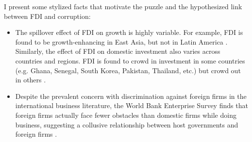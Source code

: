I present some stylized facts that motivate the puzzle and the hypothesized link between FDI and corruption:

\begin{itemize}
	\item The spillover effect of FDI on growth is highly variable. For example, FDI is found to be growth-enhancing in East Asia, but not in Latin America \citep{Zhang2001}. Similarly, the effect of FDI on domestic investment also varies across countries and regions. FDI is found to crowd in investment in some countries (e.g. Ghana, Senegal, South Korea, Pakistan, Thailand, etc.) but crowd out in others \citep{Agosin2005}.
	
	\item Despite the prevalent concern with discrimination against foreign firms in the international business literature, the World Bank Enterprise Survey finds that foreign firms actually face fewer obstacles than domestic firms while doing business, suggesting a collusive relationship between host governments and foreign firms \citep{Batra2003}.
\end{itemize}
